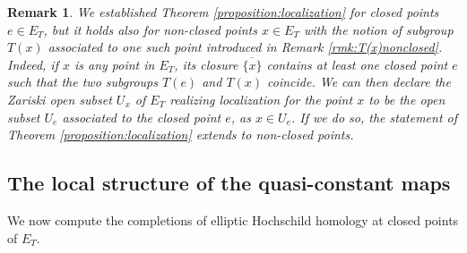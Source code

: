 \documentclass[11pt,letterpaper]{amsart}
\newtheorem{remark}[dummy]{Remark}
\newcommand{\Mapo}[2]{\underline{\mathrm{Map}}^{0}\left (#1,#2\right )}
\newcommand{\Spec}{\mathrm{S}\mathrm{pec}\,}
\newcommand{\Pic}{\underline{\mathrm{Pic}}}
\begin{document}


\begin{remark}
We established Theorem \ref{proposition:localization} for closed points $e\in E_T$, but it holds also for non-closed points $x \in E_T$ with the notion of subgroup $T(x)$ associated to one such point introduced in Remark \ref{rmk:T(x)nonclosed}. Indeed, if $x$ is any point in $E_T$, its closure $\overline{\{x\}}$ contains at least one closed point $e$ such that the two subgroups $T(e)$ and $T(x)$ coincide. We can then declare the Zariski open subset $U_x$ of $E_T$ realizing localization for the point $x$ to be the open subset $U_e$ associated to the closed point $e$, as $x \in U_e$. If we do so, the statement of Theorem \ref{proposition:localization} extends to non-closed points. 
\end{remark}

\subsection{The local structure of the quasi-constant maps}
We now compute the completions of elliptic Hochschild homology at closed points of $E_T$. 
\end{document}
